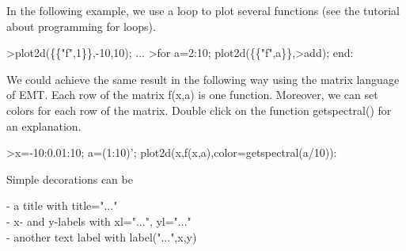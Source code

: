 \documentclass{article}
\begin{document}
\begin{eulernotebook}
\begin{eulercomment}
\begin{eulercomment}
\begin{eulercomment}
\begin{eulercomment}
\begin{eulercomment}
\begin{eulercomment}
\begin{eulercomment}
In the following example, we use a loop to plot several functions (see the tutorial
about programming for loops).
\end{eulercomment}
\begin{eulerprompt}
>plot2d(\{\{"f",1\}\},-10,10); ...
>for a=2:10; plot2d(\{\{"f",a\}\},>add); end:
\end{eulerprompt}
\begin{eulercomment}
We could achieve the same result in the following way using the matrix language of EMT.
Each row of the matrix f(x,a) is one function. Moreover, we can set colors for each row
of the matrix. Double click on the function getspectral() for an explanation.
\end{eulercomment}
\begin{eulerprompt}
>x=-10:0.01:10; a=(1:10)'; plot2d(x,f(x,a),color=getspectral(a/10)):
\end{eulerprompt}
\begin{eulercomment}
Simple decorations can be

- a title with title="..."\\
- x- and y-labels with xl="...", yl="..."\\
- another text label with label("...",x,y)


\end{eulercomment}
\end{eulercomment}
\end{eulercomment}
\end{eulercomment}
\end{eulercomment}
\end{eulercomment}
\end{eulercomment}
\end{eulernotebook}
\end{document}
